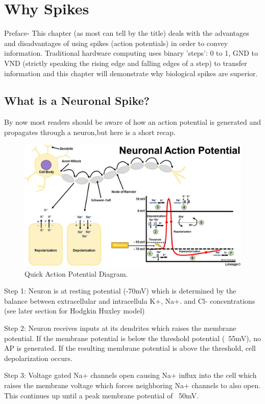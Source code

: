 \documentclass[main]{subfiles}
\begin{document}
\newpage
\section{Why Spikes}

Preface- This chapter (as most can tell by the title) deals with the advantages and disadvantages of using spikes (action potentials) in order to convey information. Traditional hardware computing uses binary 'steps': 0 to 1, GND to VND (strictly speaking the rising edge and falling edges of a step) to transfer information and this chapter will demonstrate why biological spikes are superior.


\subsection{What is a Neuronal Spike?}

By now most readers should be aware of how an action potential is generated and propagates through a neuron,but here is a short recap.

  \begin{figure}[H]
	\centering
	\includegraphics[width=0.9\linewidth]{09_WhySpikes/figures/neuronal action potential.jpg}
	\caption{Quick Action Potential Diagram.}
  \end{figure}

Step 1: Neuron is at resting potential (-70mV) which is determined by the balance between extracellular and intracellula K+, Na+. and Cl- concentrations (see later section for Hodgkin Huxley model)

Step 2: Neuron receives inputs at its dendrites which raises the membrane potential. If the membrane potential is below the threshold potential (~55mV), no AP is generated. If the resulting membrane potential is above the threshold, cell depolarization occurs.

Step 3: Voltage gated Na+ channels open causing Na+ influx into the cell which raises the membrane voltage which forces neighboring Na+ channels to also open. This continues up until a peak membrane potential of ~50mV.
\end{document}
